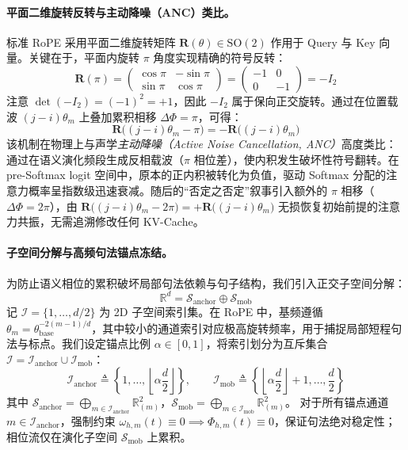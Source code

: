 \documentclass[11pt,a4paper]{article}
\theoremstyle{definition}
\begin{document}
\paragraph{平面二维旋转反转与主动降噪（ANC）类比。}
标准 RoPE 采用平面二维旋转矩阵 $\mathbf{R}(\theta) \in \mathrm{SO}(2)$ 作用于 Query 与 Key 向量。关键在于，平面内旋转 $\pi$ 角度实现精确的符号反转：
\begin{equation}
\mathbf{R}(\pi) = \begin{pmatrix} \cos\pi & -\sin\pi \\ \sin\pi & \cos\pi \end{pmatrix} = \begin{pmatrix} -1 & 0 \\ 0 & -1 \end{pmatrix} = -I_2
\end{equation}
注意 $\det(-I_2) = (-1)^2 = +1$，因此 $-I_2$ 属于保向正交旋转。通过在位置载波 $(j - i)\theta_m$ 上叠加累积相移 $\Delta\Phi = \pi$，可得：
\begin{equation}
\mathbf{R}\big((j - i)\theta_m - \pi\big) = -\mathbf{R}\big((j - i)\theta_m\big)
\end{equation}
该机制在物理上与声学\emph{主动降噪（Active Noise Cancellation, ANC）}高度类比：通过在语义演化频段生成反相载波（$\pi$ 相位差），使内积发生破坏性符号翻转。在 pre-Softmax logit 空间中，原本的正内积被转化为负值，驱动 Softmax 分配的注意力概率呈指数级迅速衰减。随后的“否定之否定”叙事引入额外的 $\pi$ 相移（$\Delta\Phi = 2\pi$），由 $\mathbf{R}\big((j - i)\theta_m - 2\pi\big) = +\mathbf{R}\big((j - i)\theta_m\big)$ 无损恢复初始前提的注意力共振，无需追溯修改任何 KV-Cache。

\paragraph{子空间分解与高频句法锚点冻结。}
为防止语义相位的累积破坏局部句法依赖与句子结构，我们引入正交子空间分解：
\begin{equation}
\mathbb{R}^d = \mathcal{S}_{\text{anchor}} \oplus \mathcal{S}_{\text{mob}}
\end{equation}
记 $\mathcal{I} = \{1, \dots, d/2\}$ 为 2D 子空间索引集。在 RoPE 中，基频遵循 $\theta_m = \theta_{\text{base}}^{-2(m-1)/d}$，其中较小的通道索引对应极高旋转频率，用于捕捉局部短程句法与标点。我们设定锚点比例 $\alpha \in [0, 1]$，将索引划分为互斥集合 $\mathcal{I} = \mathcal{I}_{\text{anchor}} \cup \mathcal{I}_{\text{mob}}$：
\begin{equation}
\mathcal{I}_{\text{anchor}} \triangleq \left\{1, \dots, \left\lfloor \alpha \frac{d}{2} \right\rfloor \right\}, \qquad \mathcal{I}_{\text{mob}} \triangleq \left\{\left\lfloor \alpha \frac{d}{2} \right\rfloor + 1, \dots, \frac{d}{2} \right\}
\end{equation}
其中 $\mathcal{S}_{\text{anchor}} = \bigoplus_{m \in \mathcal{I}_{\text{anchor}}} \mathbb{R}^2_{(m)}$，$\mathcal{S}_{\text{mob}} = \bigoplus_{m \in \mathcal{I}_{\text{mob}}} \mathbb{R}^2_{(m)}$。
对于所有锚点通道 $m \in \mathcal{I}_{\text{anchor}}$，强制约束 $\omega_{h,m}(t) \equiv 0 \implies \Phi_{h,m}(t) \equiv 0$，保证句法绝对稳定性；相位流仅在演化子空间 $\mathcal{S}_{\text{mob}}$ 上累积。
\end{document}

